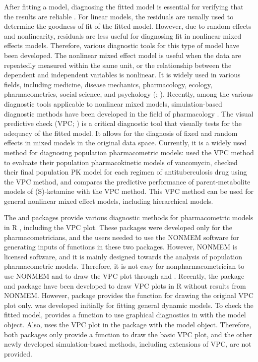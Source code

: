 After fitting a model, diagnosing the fitted model is essential for verifying that the results are reliable \citep{nguyen2017model}. For linear models, the residuals are usually used to determine the goodness of fit of the fitted model. However, due to random effects and nonlinearity, residuals are less useful for diagnosing fit in nonlinear mixed effects models. Therefore, various diagnostic tools for this type of model have been developed. The nonlinear mixed effect model is useful when the data are repeatedly measured within the same unit, or the relationship between the dependent and independent variables is nonlinear. It is widely used in various fields, including medicine, disease mechanics, pharmacology, ecology, pharmacometrics,  social science, and psychology (\citealp*{pinheiro2006mixed}; \citealp*{davidian2017nonlinear}). Recently, among the various diagnostic tools applicable to  nonlinear mixed models, simulation-based diagnostic methods have been developed in the field of pharmacology \citep{karlsson2007diagnosing}. The visual predictive check (VPC; \citealp*{karlsson2008tutorial} ) is a critical diagnostic tool that visually tests for the adequacy of the fitted model. It allows for the diagnosis of fixed and random effects in mixed models \citep{karlsson2008tutorial} in the original data space.
Currently, it is a widely used method for diagnosing population pharmacometric models:
\cite{heus2022model} used the VPC method to evaluate their population pharmacokinetic models of vancomycin, \cite{mudde2022predictive} checked their final population PK model for each regimen of antituberculosis drug using the VPC method, and \cite{otto2021predictive} compares the predictive performance of parent-metabolite models of (S)-ketamine with the VPC method. This VPC method can be used for general nonlinear mixed effect models, including hierarchical models.


The  \citep{lindbom2004perl} and  \citep{keizer2013modeling} packages provide various diagnostic methods for pharmacometric models in R \citep{R}, including the VPC plot. These packages were developed only for the pharmacometricians, and the users needed to use the NONMEM software \citep{bauer2011nonmem} for generating inputs of functions in these two packages. However, NONMEM is licensed software, and it is mainly designed towards the analysis of population pharmacometric models. Therefore, it is not easy for nonpharmacometrician to use NONMEM and to draw the VPC plot through  and . Recently, the  \citep{keizer2018vpc}  package and  \citep{fidler2019nonlinear}  package have been developed to draw VPC plots in R without  results from NONMEM. However,  package provides the function for drawing the original VPC plot only.  was developed initially for fitting general dynamic models. To check the fitted model,  provides a function to use graphical diagnostics in  with the  model object. Also,  uses the VPC plot in the  package with the  model object. Therefore, both packages only provide a function to draw the basic VPC plot, and the other newly developed simulation-based methods, including extensions of VPC, are not provided.

